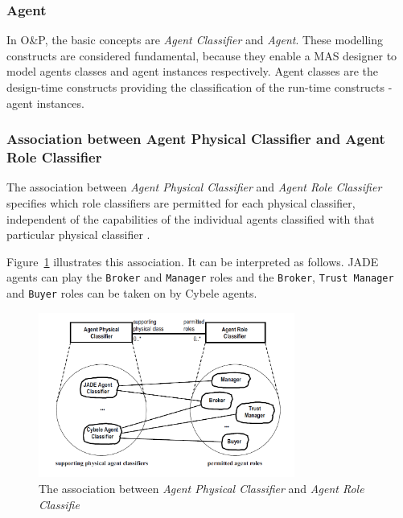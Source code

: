 \subsubsection*{Agent}

In O\&P, the basic concepts are \textit{Agent Classifier} and \textit{Agent}.
These modelling constructs are considered fundamental, because they enable a MAS designer to model agents classes and agent instances respectively.
Agent classes are the design-time constructs providing the classification of the run-time constructs - agent instances.

\subsubsection*{Association between Agent Physical Classifier and Agent Role Classifier}

The association between \textit{Agent Physical Classifier} and \textit{Agent Role Classifier} specifies which role classifiers are permitted for each physical classifier, independent of the capabilities of the individual agents classified with that particular physical classifier \cite{Odell05}.

Figure~\ref{figure:onp-physical-classifier-role-classifier-association} illustrates this association.
It can be interpreted as follows. JADE agents can play the \texttt{Broker} and \texttt{Manager} roles and the \texttt{Broker}, \texttt{Trust Manager} and \texttt{Buyer} roles can be taken on by Cybele agents.

\begin{figure}[ht]
	\centering
	\includegraphics[width=0.75\textwidth]{images/onp/physical-classifier-role-classifier-association.png}
	\caption{The association between \textit{Agent Physical Classifier} and \textit{Agent Role Classifie}}
	\label{figure:onp-physical-classifier-role-classifier-association}
\end{figure}

